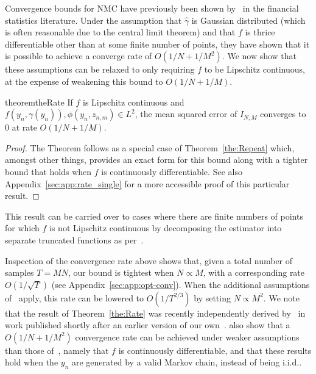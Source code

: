 Convergence bounds for NMC have previously been shown by~\citet{hong2009estimating} in the 
financial statistics literature.  Under the assumption that $\hat{\gamma}$ is Gaussian distributed
(which is often reasonable due to the central limit theorem) and that $f$ is thrice differentiable
other than at some finite number of points, they have shown that it is possible to achieve a
converge rate of $O(1/N+1/M^2)$.  We now show that these assumptions can be relaxed to only requiring
$f$ to be Lipschitz continuous, at the expense of weakening this bound to $O(1/N+1/M)$.
\begin{restatable}{theorem}{theRate} \label{the:Rate}
	If $f$ is Lipschitz continuous and $f(y_n, \gamma(y_n)), \phi(y_n, z_{n,m}) \in
	L^2$, the mean squared error of $I_{N,M}$ converges to $0$ at rate $O\left(1/N +
	1/M\right)$.
\end{restatable}
\begin{proof}
The Theorem follows as a special case of Theorem~\ref{the:Repeat} which,
amongst other things, provides an exact form for this bound along with a tighter bound
that holds when $f$ is continuously differentiable.  See also Appendix~\ref{sec:app:rate_single}
for a more accessible proof of this particular result.
\end{proof}
\begin{remark}
This result can be carried over to cases where there are finite numbers of points for which $f$ is
not Lipschitz continuous by decomposing the estimator into separate truncated functions as
per~\cite{hong2009estimating}.
\end{remark}
Inspection of the convergence rate above shows that, given a total number of samples
$T=MN$, our bound is tightest when $N\propto M$, with a
corresponding rate $O(1/\sqrt{T})$ (see Appendix~\ref{sec:app:opt-conv}). 
When the additional assumptions of~\citet{hong2009estimating}
apply, this rate can be lowered to $O(1/T^{2/3})$ by setting $N \propto M^2$.  
We note that
the result of Theorem~\ref{the:Rate} was recently independently derived by~\citet{fort2016mcmc}
in work published shortly after an earlier version of our own~\citep{rainforth2016pitfalls}.
\citet{fort2016mcmc} also show that a $O(1/N+1/M^2)$ convergence rate can be achieved under
weaker assumptions than those of~\citet{hong2009estimating}, namely that $f$ is continuously differentiable,
and that these results hold when the $y_n$ are generated by a valid Markov chain, instead of being i.i.d..

